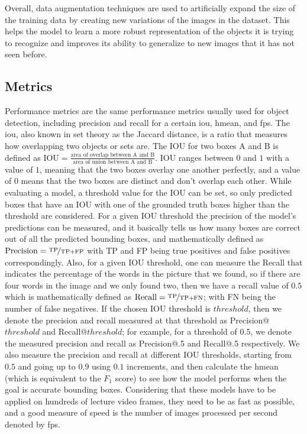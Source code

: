 Overall, data augmentation techniques are used to artificially expand the size of the training data by creating new variations of the images in the dataset. This helps the model to learn a more robust representation of the objects it is trying to recognize and improves its ability to generalize to new images that it has not seen before.

\subsection{Metrics}

Performance metrics are the same performance metrics usually used for object detection, including precision and recall for a certain \gls{iou}, \gls{hmean}, and \gls{fps}. The \gls{iou}, also known in set theory as the Jaccard distance, is a ratio that measures how overlapping two objects or sets are. The IOU for two boxes A and B is defined as $\text{IOU} = \frac{\text{area of overlap between A and B}}{\text{area of union between A and B}}$. IOU ranges between $0$ and $1$ with a value of $1$, meaning that the two boxes overlay one another perfectly, and a value of $0$ means that the two boxes are distinct and don't overlap each other. While evaluating a model, a threshold value for the IOU can be set, so only predicted boxes that have an IOU with one of the grounded truth boxes higher than the threshold are considered. For a given IOU threshold the precision of the model's predictions can be measured, and it basically tells us how many boxes are correct out of all the predicted bounding boxes, and mathematically defined as $\text{Precision} = \nicefrac{\text{TP}}{\text{TP} + \text{FP}}$ with TP and FP being true positives and false positives correspondingly. Also, for a given IOU threshold, one can measure the Recall that indicates the percentage of the words in the picture that we found, so if there are four words in the image and we only found two, then we have a recall value of $0.5$ which is mathematically defined as $\text{Recall} = \nicefrac{\text{TP}}{\text{TP} + \text{FN}}$; with FN being the number of false negatives. If the chosen IOU threshold is $threshold$, then we denote the precision and recall measured at that threshold as Precision@$threshold$ and Recall@$threshold$; for example, for a threshold of $0.5$, we denote the measured precision and recall as Precision@.5 and Recall@.5 respectively. We also measure the precision and recall at different IOU thresholds, starting from $0.5$ and going up to $0.9$ using $0.1$ increments, and then calculate the \gls{hmean} (which is equivalent to the $F_1$ score) to see how the model performs when the goal is accurate bounding boxes. Considering that these models have to be applied on hundreds of lecture video frames, they need to be as fast as possible, and a good measure of speed is the number of images processed per second denoted by \gls{fps}.

